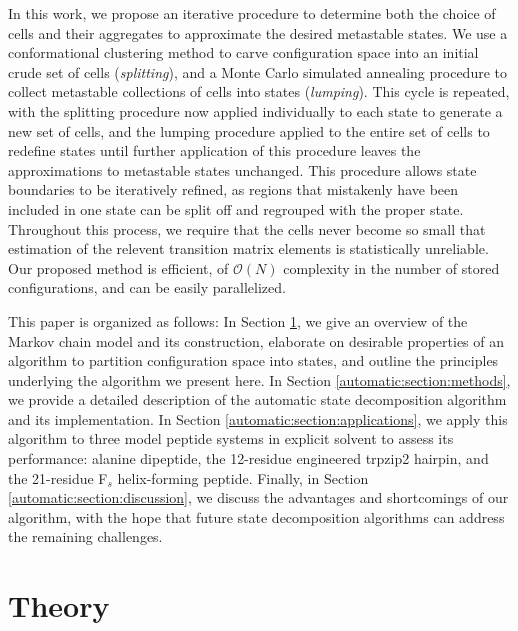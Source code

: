 In this work, we propose an iterative procedure to determine both the choice of cells and their aggregates to approximate the desired metastable states.
We use a conformational clustering method to carve configuration space into an initial crude set of cells (\emph{splitting}), and a Monte Carlo simulated annealing procedure to collect metastable collections of cells into states (\emph{lumping}).
This cycle is repeated, with the splitting procedure now applied individually to each state to generate a new set of cells, and the lumping procedure applied to the entire set of cells to redefine states until further application of this procedure leaves the approximations to metastable states unchanged.
This procedure allows state boundaries to be iteratively refined, as regions that mistakenly have been included in one state can be split off and regrouped with the proper state.
Throughout this process, we require that the cells never become so small that estimation of the relevent transition matrix elements is statistically unreliable.
Our proposed method is efficient, of $\mathcal{O}(N)$ complexity in the number of stored configurations, and can be easily parallelized.

This paper is organized as follows:
In Section \ref{automatic:section:theory}, we give an overview of the Markov chain model and its construction, elaborate on desirable properties of an algorithm to partition configuration space into states, and outline the principles underlying the algorithm we present here.
In Section \ref{automatic:section:methods}, we provide a detailed description of the automatic state decomposition algorithm and its implementation.
In Section \ref{automatic:section:applications}, we apply this algorithm to three model peptide systems in explicit solvent to assess its performance: alanine dipeptide, the 12-residue engineered trpzip2 hairpin, and the 21-residue F$_s$ helix-forming peptide.
Finally, in Section \ref{automatic:section:discussion}, we discuss the advantages and shortcomings of our algorithm, with the hope that future state decomposition algorithms can address the remaining challenges.

\section{Theory}
\label{automatic:section:theory}

